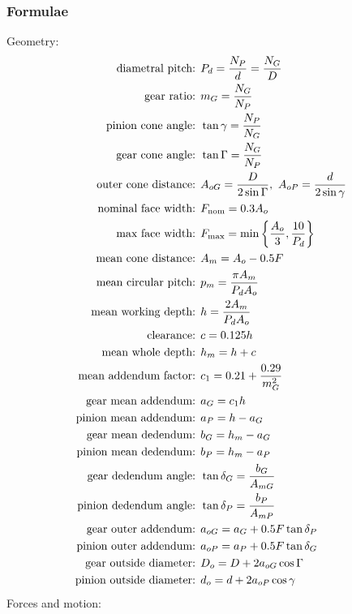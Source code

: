 \documentclass[11pt, fleqn]{article}
\begin{document}
\subsubsection{Formulae}
Geometry:
\begin{align*}
    \text{diametral pitch: }&P_d=\frac{N_P}{d}=\frac{N_G}{D}\\
    \text{gear ratio: }&m_G=\frac{N_G}{N_P}\\
    \text{pinion cone angle: }&\tan\gamma=\frac{N_P}{N_G}\\
    \text{gear cone angle: }&\tan\Gamma=\frac{N_G}{N_P}\\
    \text{outer cone distance: }&A_{oG}=\frac{D}{2\sin\Gamma},\ A_{oP}=\frac{d}{2\sin\gamma}\\
    \text{nominal face width: }&F_\text{nom}=0.3A_o\\
    \text{max face width: }&F_\text{max}=\min\brcurly{\frac{A_o}{3},\frac{10}{P_d}}\\
    \text{mean cone distance: }&A_m=A_o-0.5F\\
    \text{mean circular pitch: }&p_m=\frac{\pi A_m}{P_dA_o}\\
    \text{mean working depth: }&h=\frac{2A_m}{P_dA_o}\\
    \text{clearance: }&c=0.125h\\
    \text{mean whole depth: }&h_m=h+c\\
    \text{mean addendum factor: }&c_1=0.21+\frac{0.29}{m_G^2}\\
    \text{gear mean addendum: }&a_G=c_1h\\
    \text{pinion mean addendum: }&a_P=h-a_G\\
    \text{gear mean dedendum: }&b_G=h_m-a_G\\
    \text{pinion mean dedendum: }&b_P=h_m-a_P\\
    \text{gear dedendum angle: }&\tan\delta_G=\frac{b_G}{A_{mG}}\\
    \text{pinion dedendum angle: }&\tan\delta_P=\frac{b_P}{A_{mP}}\\
    \text{gear outer addendum: }&a_{oG}=a_G+0.5F\tan\delta_P\\
    \text{pinion outer addendum: }&a_{oP}=a_P+0.5F\tan\delta_G\\
    \text{gear outside diameter: }&D_o=D+2a_{oG}\cos\Gamma\\
    \text{pinion outside diameter: }&d_o=d+2a_{oP}\cos\gamma
\end{align*}
Forces and motion:
\end{document}
